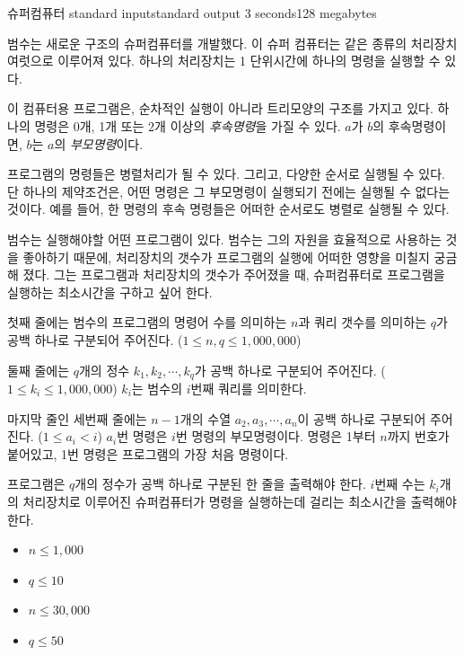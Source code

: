 \begin{problem}{슈퍼컴퓨터}
	{standard input}{standard output}
	{3 seconds}{128 megabytes}{}
	
	범수는 새로운 구조의 슈퍼컴퓨터를 개발했다. 이 슈퍼 컴퓨터는 같은 종류의 처리장치 여럿으로 이루어져 있다. 하나의 처리장치는 1 단위시간에 하나의 명령을 실행할 수 있다.
	
	이 컴퓨터용 프로그램은, 순차적인 실행이 아니라 트리모양의 구조를 가지고 있다. 하나의 명령은 0개, 1개 또는 2개 이상의 \textit{후속명령}을 가질 수 있다. $a$가 $b$의 후속명령이면, $b$는 $a$의 \textit{부모명령}이다.
	
	프로그램의 명령들은 병렬처리가 될 수 있다. 그리고, 다양한 순서로 실행될 수 있다. 단 하나의 제약조건은, 어떤 명령은 그 부모명령이 실행되기 전에는 실행될 수 없다는 것이다. 예를 들어, 한 명령의 후속 명령들은 어떠한 순서로도 병렬로 실행될 수 있다.
	
	범수는 실행해야할 어떤 프로그램이 있다. 범수는 그의 자원을 효율적으로 사용하는 것을 좋아하기 때문에, 처리장치의 갯수가 프로그램의 실행에 어떠한 영향을 미칠지 궁금해 졌다. 그는 프로그램과 처리장치의 갯수가 주어졌을 때, 슈퍼컴퓨터로 프로그램을 실행하는 최소시간을 구하고 싶어 한다.
	
	\InputFile
	
	첫째 줄에는 범수의 프로그램의 명령어 수를 의미하는 $n$과 쿼리 갯수를 의미하는 $q$가 공백 하나로 구분되어 주어진다. ($1 \le n, q \le 1,000,000$) 
	
	둘째 줄에는 $q$개의 정수 $k_1, k_2, \cdots, k_q$가 공백 하나로 구분되어 주어진다. ($1 \le k_i \le 1,000,000$) $k_i$는 범수의 $i$번째 쿼리를 의미한다.
	
	마지막 줄인 세번째 줄에는 $n-1$개의 수열 $a_2, a_3, \cdots, a_n$이 공백 하나로 구분되어 주어진다. ($1 \le a_i < i$) $a_i$번 명령은 $i$번 명령의 부모명령이다. 명령은 1부터 $n$까지 번호가 붙어있고, 1번 명령은 프로그램의 가장 처음 명령이다.
	
	
	\OutputFile
	
	프로그램은 $q$개의 정수가 공백 하나로 구분된 한 줄을 출력해야 한다. $i$번째 수는 $k_i$개의 처리장치로 이루어진 슈퍼컴퓨터가 명령을 실행하는데 걸리는 최소시간을 출력해야 한다.	
	
	\begin{itemize}
		\item $n \le 1,000$
		\item $q \le 10$
	\end{itemize}
	
	\begin{itemize}
		\item $n \le 30, 000$
		\item $q \le 50$
	\end{itemize}
	

\end{problem}
